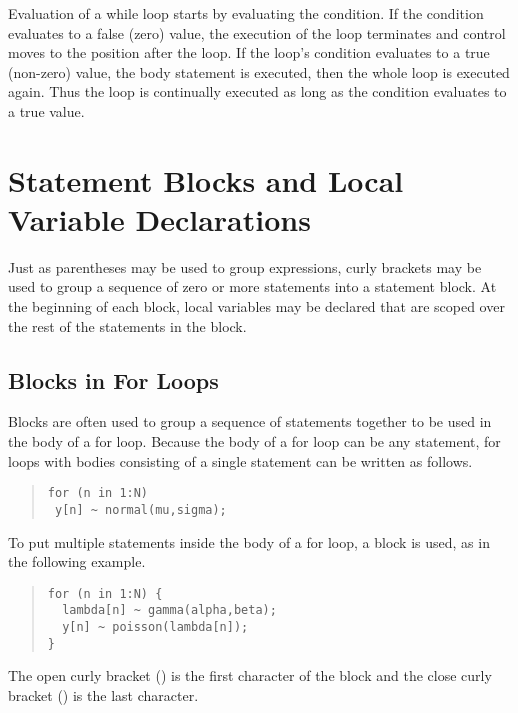 Evaluation of a while loop starts by evaluating the condition.  If the
condition evaluates to a false (zero) value, the execution of the loop
terminates and control moves to the position after the loop.  If the
loop's condition evaluates to a true (non-zero) value, the body statement is
executed, then the whole loop is executed again.  Thus the loop is
continually executed as long as the condition evaluates to a true value.


\section{Statement Blocks and Local Variable Declarations}

Just as parentheses may be used to group expressions, curly brackets
may be used to group a sequence of zero or more statements into a
statement block.  At the beginning of each block, local variables may be
declared that are scoped over the rest of the statements in the block.

\subsection{Blocks in For Loops}

Blocks are often used to group a sequence of statements together to be
used in the body of a for loop.  Because the body of a for loop can be
any statement, for loops with bodies consisting of a single statement
can be written as follows.
%
\begin{quote}
\begin{Verbatim} 
for (n in 1:N) 
 y[n] ~ normal(mu,sigma);
\end{Verbatim}
\end{quote}
% 
To put multiple statements inside the body of a for loop, a block is
used, as in the following example.
%
\begin{quote}
\begin{Verbatim}[fontsize=\small]
for (n in 1:N) {
  lambda[n] ~ gamma(alpha,beta);
  y[n] ~ poisson(lambda[n]);
}
\end{Verbatim}
\end{quote}
%
The open curly bracket (\code{\{}) is the first character of the block
and the close curly bracket (\code{\}}) is the last character.

